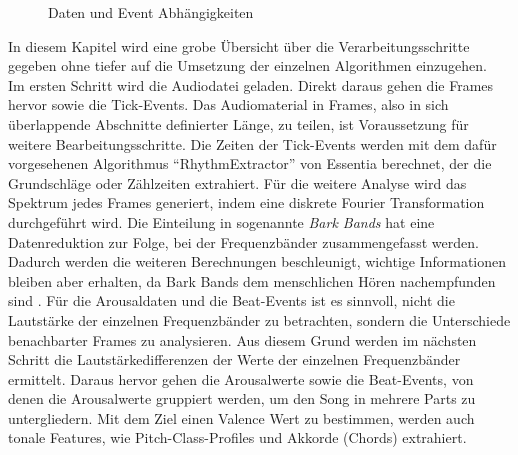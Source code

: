 \documentclass[11pt,a4paper]{article}
\begin{document}
\begin{wrapfigure}{r}{0.5\linewidth}
\captionsetup{justification=centering}
\caption[Daten und Event Abhängigkeiten]{Daten und Event Abhängigkeiten}
\end{wrapfigure}
\noindent
In diesem Kapitel wird eine grobe Übersicht über die Verarbeitungsschritte gegeben ohne tiefer auf die Umsetzung der einzelnen Algorithmen einzugehen.\\
Im ersten Schritt wird die Audiodatei geladen. Direkt daraus gehen die Frames hervor sowie die Tick-Events. Das Audiomaterial in Frames, also in sich überlappende Abschnitte definierter Länge, zu teilen, ist Voraussetzung für weitere Bearbeitungsschritte. Die Zeiten der Tick-Events werden mit dem dafür vorgesehenen Algorithmus ``RhythmExtractor'' von Essentia berechnet, der die Grundschläge oder Zählzeiten extrahiert. Für die weitere Analyse wird das Spektrum jedes Frames generiert, indem eine diskrete Fourier Transformation durchgeführt wird. Die Einteilung in sogenannte \textit{Bark Bands} hat eine Datenreduktion zur Folge, bei der Frequenzbänder zusammengefasst werden. Dadurch werden die weiteren Berechnungen beschleunigt, wichtige Informationen bleiben aber erhalten, da Bark Bands dem menschlichen Hören nachempfunden sind \cite[S. 80]{lerch2012introduction}. Für die Arousaldaten und die Beat-Events ist es sinnvoll, nicht die Lautstärke der einzelnen Frequenzbänder zu betrachten, sondern die Unterschiede benachbarter Frames zu analysieren. Aus diesem Grund werden im nächsten Schritt die Lautstärkedifferenzen der Werte der einzelnen Frequenzbänder ermittelt. Daraus hervor gehen die Arousalwerte sowie die Beat-Events, von denen die Arousalwerte gruppiert werden, um den Song in mehrere Parts zu untergliedern. Mit dem Ziel einen Valence Wert zu bestimmen, werden auch tonale Features, wie Pitch-Class-Profiles und Akkorde (Chords) extrahiert.\\
\end{document}
